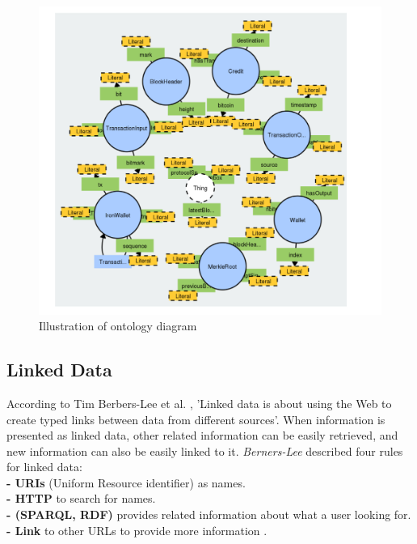 \begin{center}
	
	
	\begin{figure}[htb!]
		
		\begin{minipage}{0.55\linewidth}
			\centering
			\includegraphics[width=1.65\textwidth]{images/chap02_diagram_ontology.png}
		\end{minipage}
		\caption[Illustration of ontology diagram]{Illustration of ontology diagram \cite{Matthew}}
		
		
	\end{figure}
	
\end{center}

\subsection{Linked Data}
According to Tim Berbers-Lee et al. \cite{Tim}, 'Linked data is about using the Web to create typed links between data
from different sources'. When information
is presented as linked data, other related information can be easily retrieved, and new information can also be easily linked to it. \textit{Berners-Lee} described four rules for linked data:\\
\textbf{- URIs} (Uniform Resource identifier) as names.\\
\textbf{- HTTP} to search for names.\\
\textbf{- (SPARQL, RDF)} provides related information about what a user looking for. \\
\textbf{- Link} to other URLs to provide more information \cite{Hector}.\\

